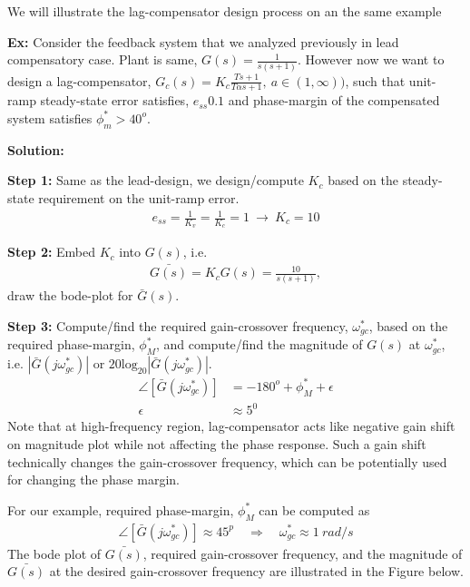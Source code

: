 \documentclass[twoside]{article}
\begin{document}
We will illustrate the lag-compensator design process on an the same example 

\vspace{6pt}

\textbf{Ex:} Consider the feedback system that we analyzed
previously in lead compensatory case. Plant is same, 
$G(s) = \frac{1}{s (s+1)}$. However now we want to
design a lag-compensator, $G_c(s) = K_c \frac{T s + 1}{T \alpha s + 1}
, \ a \in (1,\infty))$, such that unit-ramp steady-state error satisfies, $e_{ss}
0.1$ and phase-margin of the compensated system satisfies $\phi_m^*
> 40^o$. 

\textbf{Solution:}

\textbf{Step 1:} Same as the lead-design, we design/compute $K_c$ based on the steady-state 
requirement on the unit-ramp error.  
%
\begin{align}
   e_{ss} = \frac{1}{K_v} = \frac{1}{K_c} = 1 \ \rightarrow \ K_c = 10
\end{align}

\textbf{Step 2:} Embed $K_c$ into $G(s)$, i.e. 
%
\begin{align*}
  \bar{G(s)} = K_c G(s) = \frac{10}{s (s+1)} ,
\end{align*} 
%
draw the bode-plot for $\bar{G}(s)$. 

\textbf{Step 3:} Compute/find the required gain-crossover
frequency, $\omega_{gc}^*$, based on
the required phase-margin, $\phi^*_M$, and compute/find 
the magnitude of $G(s)$ at $\omega_{gc}^*$, i.e. 
$| \bar{G}(j  \omega_{gc}^*) | $ or $20 \mathrm{log}_20 | \bar{G}(j  \omega_{gc}^*) |$.
%
\begin{align*}
  \angle [ \bar{G}(j  \omega_{gc}^*) ] &= -180^o + \phi_M^* + \epsilon
  \\
  \epsilon &\approx 5^0
\end{align*}
%
Note that at high-frequency 
region, lag-compensator acts like negative gain 
shift on magnitude plot while not affecting the 
phase response. Such a gain shift technically 
changes the gain-crossover frequency, which
can be potentially used for changing the phase 
margin. 

For our example, required phase-margin, $\phi^*_M$
can be computed as
%
\begin{align*}
  \angle [ \bar{G}(j  \omega_{gc}^*) ] \approx 45^p
  \quad \Rightarrow \quad \omega_{gc}^* \approx 1 \ rad/s
\end{align*}
%
The bode plot of $\bar{G(s)}$,
required gain-crossover frequency, and  
the magnitude of $\bar{G(s)}$ at the desired 
gain-crossover frequency are 
illustrated in the Figure below. 
\end{document}
